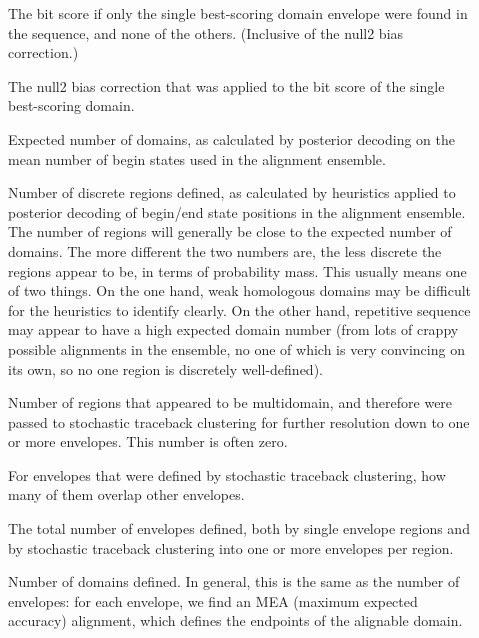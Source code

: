 \begin{description}
\item[]  The bit score if only the
  single best-scoring domain envelope were found in the sequence, and
  none of the others. (Inclusive of the null2 bias correction.)

\item[] The null2 bias correction
  that was applied to the bit score of the single best-scoring domain.

\item[] Expected number of domains, as calculated by
  posterior decoding on the mean number of begin states used in the
  alignment ensemble. 

\item[] Number of discrete regions defined, as
  calculated by heuristics applied to posterior decoding of begin/end
  state positions in the alignment ensemble.  The number of regions
  will generally be close to the expected number of domains. The more
  different the two numbers are, the less discrete the regions appear
  to be, in terms of probability mass. This usually means one of two
  things. On the one hand, weak homologous domains may be difficult
  for the heuristics to identify clearly. On the other hand,
  repetitive sequence may appear to have a high expected domain number
  (from lots of crappy possible alignments in the ensemble, no one of
  which is very convincing on its own, so no one region is discretely
  well-defined).

\item[] Number of regions that appeared to be
  multidomain, and therefore were passed to stochastic traceback
  clustering for further resolution down to one or more
  envelopes. This number is often zero.

\item[] For envelopes that were defined by stochastic
  traceback clustering, how many of them overlap other envelopes.

\item[] 
  The total number of envelopes defined, both by single envelope
  regions and by stochastic traceback clustering into one or more
  envelopes per region. 

\item[] Number of domains defined. In general, this
  is the same as the number of envelopes: for each envelope, we find
  an MEA (maximum expected accuracy) alignment, which defines the
  endpoints of the alignable domain.


\end{description}
